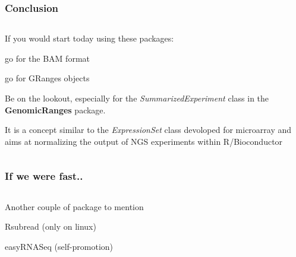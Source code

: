 \documentclass{beamer}
\begin{document}
\begin{frame}
\frametitle{Conclusion}
\begin{column}{1\textwidth}
  \bit
      \item If you would start today using these packages:
        \bit
            \item go for the BAM format
            \item go for GRanges objects
            \item Be on the lookout, especially for the \emph{SummarizedExperiment} class in the \textbf{GenomicRanges} package.
              \bit
                  \item It is a concept similar to the \emph{ExpressionSet} class devoloped for microarray and aims at normalizing the output of NGS experiments within R/Bioconductor
              \eit
        \eit
  \eit
  \end{column}
\end{frame}


\begin{frame}
\frametitle{If we were fast..}
\begin{column}{1\textwidth}
  \bit
      \item Another couple of package to mention
        \bit
            \item Rsubread (only on linux)
            \item easyRNASeq (self-promotion)
        \eit
  \eit
  \end{column}
\end{frame}

\end{document}
